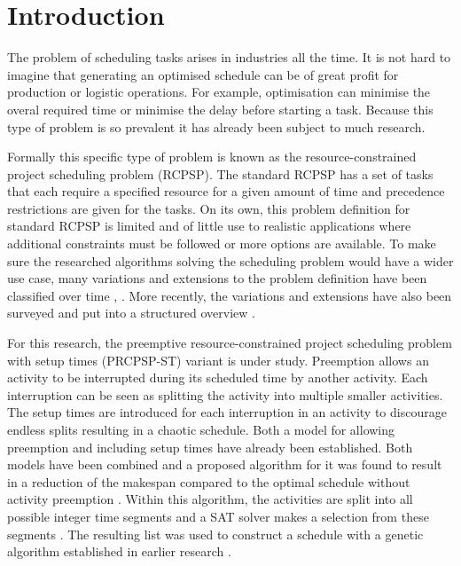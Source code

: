 \section{Introduction}
The problem of scheduling tasks arises in industries all the time. It is not hard to imagine that generating an optimised schedule can be of great profit for production or logistic operations. For example, optimisation can minimise the overal required time or minimise the delay before starting a task. Because this type of problem is so prevalent it has already been subject to much research.

Formally this specific type of problem is known as the resource-constrained project scheduling problem (RCPSP). The standard RCPSP has a set of tasks that each require a specified resource for a given amount of time and precedence restrictions are given for the tasks. On its own, this problem definition for standard RCPSP is limited and of little use to realistic applications where additional constraints must be followed or more options are available.
To make sure the researched algorithms solving the scheduling problem would have a wider use case, many variations and extensions to the problem definition have been classified over time \cite{RN9}, \cite{RN10}. More recently, the variations and extensions have also been surveyed and put into a structured overview \cite{RN6}.


For this research, the preemptive resource-constrained project scheduling problem with setup times (PRCPSP-ST) variant is under study. Preemption allows an activity to be interrupted during its scheduled time by another activity. Each interruption can be seen as splitting the activity into multiple smaller activities. The setup times are introduced for each interruption in an activity to discourage endless splits resulting in a chaotic schedule. Both a model for allowing preemption \cite{RN21} and including setup times \cite{RN13} have already been established. Both models have been combined and a proposed algorithm for it was found to result in a reduction of the makespan compared to the optimal schedule without activity preemption \cite{RN1}. Within this algorithm, the activities are split into all possible integer time segments and a SAT solver makes a selection from these segments \cite{RN3}. The resulting list was used to construct a schedule with a genetic algorithm established in earlier research \cite{RN14}.

